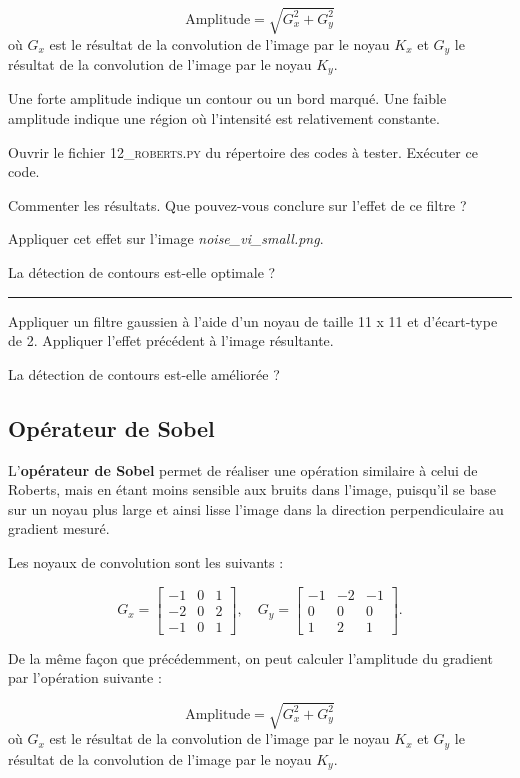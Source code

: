 $$\text{Amplitude} = \sqrt{G_x^2 + G_y^2}$$ où $G_x$ est le résultat de la convolution de l'image par le noyau $K_x$ et $G_y$ le résultat de la convolution de l'image par le noyau $K_y$.

Une forte amplitude indique un contour ou un bord marqué. Une faible amplitude indique une région où l'intensité est relativement constante.

\medskip

\Manip Ouvrir le fichier \textsc{12\_roberts.py} du répertoire des codes à tester. Exécuter ce code.

\Quest Commenter les résultats. Que pouvez-vous conclure sur l'effet de ce filtre ?

\Manip Appliquer cet effet sur l'image \textsl{noise\_vi\_small.png}.

\Quest La détection de contours est-elle optimale ?

\noindent \rule{\linewidth}{1pt}

\Manip Appliquer un filtre gaussien à l'aide d'un noyau de taille 11 x 11 et d'écart-type de 2. Appliquer l'effet précédent à l'image résultante.

\Quest La détection de contours est-elle améliorée ?

\newpage
\subsection{Opérateur de Sobel}

L'\textbf{opérateur de Sobel} permet de réaliser une opération similaire à celui de Roberts, mais en étant moins sensible aux bruits dans l'image, puisqu'il se base sur un noyau plus large et ainsi lisse l'image dans la direction perpendiculaire au gradient mesuré.

Les noyaux de convolution sont les suivants :

$$G_x = \begin{bmatrix}
-1 & 0 & 1 \\
-2 & 0 & 2 \\
-1 & 0 & 1 
\end{bmatrix},
\quad
G_y =
\begin{bmatrix}
-1 & -2 & -1 \\
0 & 0 & 0 \\
1 & 2 & 1 
\end{bmatrix}.
$$

De la même façon que précédemment, on peut calculer l'amplitude du gradient par l'opération suivante : 

$$\text{Amplitude} = \sqrt{G_x^2 + G_y^2}$$ où $G_x$ est le résultat de la convolution de l'image par le noyau $K_x$ et $G_y$ le résultat de la convolution de l'image par le noyau $K_y$.

